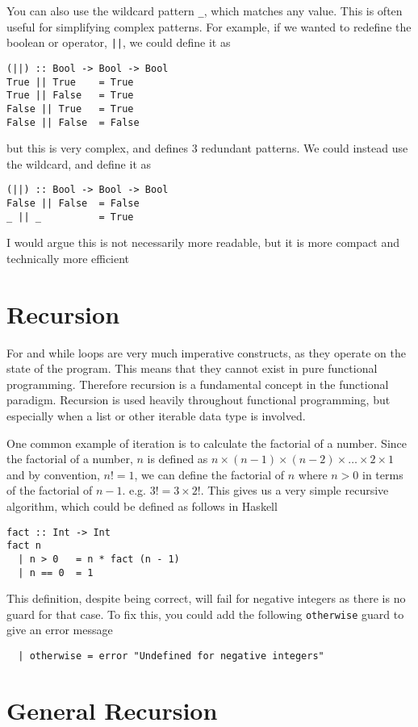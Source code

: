 You can also use the wildcard pattern \verb`_`, which matches any value. This is often useful for simplifying complex
 patterns. For example, if we wanted to redefine the boolean or operator, \verb`||`, we could define it as
\begin{verbatim}
(||) :: Bool -> Bool -> Bool
True || True    = True
True || False   = True
False || True   = True
False || False  = False
\end{verbatim}
but this is very complex, and defines 3 redundant patterns. We could instead use the wildcard, and define it as
\begin{verbatim}
(||) :: Bool -> Bool -> Bool
False || False  = False
_ || _          = True
\end{verbatim}
I would argue this is not necessarily more readable, but it is more compact and technically more efficient

\section*{Recursion}

For and while loops are very much imperative constructs, as they operate on the state of the program. This means that
 they cannot exist in pure functional programming. Therefore recursion is a fundamental concept in the functional
 paradigm. Recursion is used heavily throughout functional programming, but especially when a list or other iterable
 data type is involved.

One common example of iteration is to calculate the factorial of a number. Since the factorial of a number, $n$ is
 defined as $n \times (n - 1) \times (n - 2) \times \dots \times 2 \times 1$ and by convention, $n! = 1$, we can define
 the factorial of $n$ where $n > 0$ in terms of the factorial of $n - 1$. e.g. $3! = 3 \times 2!$. This gives us a very
 simple recursive algorithm, which could be defined as follows in Haskell
\begin{verbatim}
fact :: Int -> Int
fact n
  | n > 0   = n * fact (n - 1)
  | n == 0  = 1
\end{verbatim}
This definition, despite being correct, will fail for negative integers as there is no guard for that case. To fix this,
 you could add the following \verb`otherwise` guard to give an error message
\begin{verbatim}
  | otherwise = error "Undefined for negative integers"
\end{verbatim}

\section*{General Recursion}

